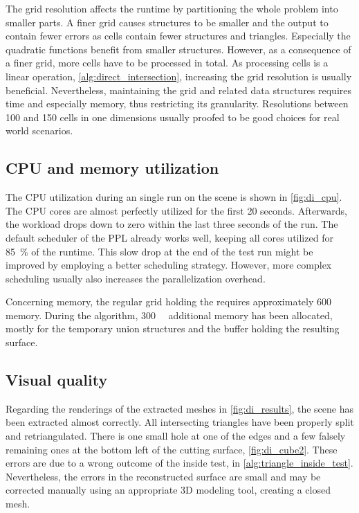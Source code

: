 The grid resolution affects the runtime by partitioning the whole problem into smaller parts.
A finer grid causes structures to be smaller and the output to contain fewer errors as cells contain fewer structures and triangles.
Especially the quadratic functions benefit from smaller structures.
However, as a consequence of a finer grid, more cells have to be processed in total.
As processing cells is a linear operation, \cf \cref{alg:direct_intersection}, increasing the grid resolution is usually beneficial.
Nevertheless, maintaining the grid and related data structures requires time and especially memory, thus restricting its granularity.
Resolutions between 100 and 150 cells in one dimensions usually proofed to be good choices for real world scenarios.


\subsection{CPU and memory utilization}

The CPU utilization during an single run on the \impeller scene is shown in \cref{fig:di_cpu}.
The CPU cores are almost perfectly utilized for the first 20 seconds.
Afterwards, the workload drops down to zero within the last three seconds of the run.
The default scheduler of the PPL already works well, keeping all cores utilized for \SI{85}{\percent} of the runtime.
This slow drop at the end of the test run might be improved by employing a better scheduling strategy.
However, more complex scheduling usually also increases the parallelization overhead.

Concerning memory, the regular grid holding the \impeller requires approximately \SI{600}{\mebi\byte} memory.
During the algorithm, \SI{300}{\mebi\byte} additional memory has been allocated, mostly for the temporary union structures and the buffer holding the resulting surface.


\subsection{Visual quality}

Regarding the renderings of the extracted meshes in \cref{fig:di_results}, the \cubes scene has been extracted almost correctly.
All intersecting triangles have been properly split and retriangulated.
There is one small hole at one of the edges and a few falsely remaining ones at the bottom left of the cutting surface, \cf \cref{fig:di_cube2}.
These errors are due to a wrong outcome of the inside test, \cf {} in \cref{alg:triangle_inside_test}.
Nevertheless, the errors in the reconstructed surface are small and may be corrected manually using an appropriate 3D modeling tool, creating a closed mesh.

